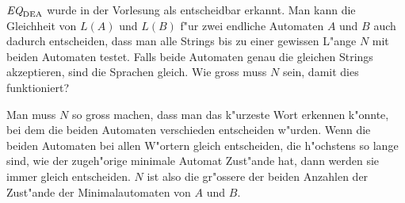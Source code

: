 $\text{\it EQ}_{\text{DEA}}$ wurde in der Vorlesung als entscheidbar
erkannt. Man kann die Gleichheit von $L(A)$ und $L(B)$ f"ur
zwei endliche Automaten $A$ und $B$ auch dadurch entscheiden,
dass man alle Strings bis zu einer gewissen L"ange $N$ mit
beiden Automaten testet. Falls beide Automaten genau die
gleichen Strings akzeptieren, sind die Sprachen gleich.
Wie gross muss $N$ sein, damit dies funktioniert?

\begin{loesung}
Man muss $N$ so gross machen, dass man das k"urzeste Wort erkennen
k"onnte, bei dem die beiden Automaten verschieden entscheiden
w"urden. Wenn die beiden Automaten bei allen W"ortern gleich entscheiden,
die h"ochstens so lange sind, wie der zugeh"orige minimale Automat Zust"ande
hat, dann werden sie immer gleich entscheiden. $N$ ist also die gr"ossere
der beiden Anzahlen der Zust"ande der Minimalautomaten von $A$ und $B$.
\end{loesung}
